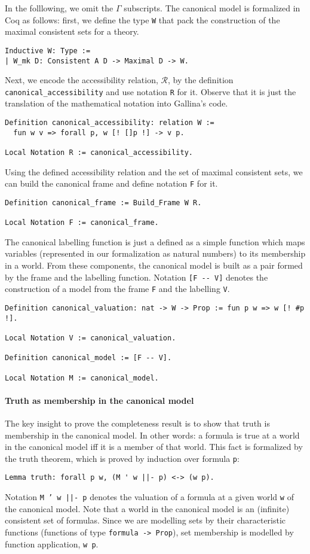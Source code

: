 \documentclass[3p,times]{elsarticle}
\begin{document}
In the folllowing, we omit the $\Gamma$ subscripts. The canonical model is formalized in Coq as follows: first, we define the type \texttt{W} that pack
the construction of the maximal consistent sets for a theory.
\begin{verbatim}
Inductive W: Type :=
| W_mk D: Consistent A D -> Maximal D -> W.
\end{verbatim}
Next, we encode the accessibility relation, $\mathcal{R}$, by
the definition \texttt{canonical_accessibility} and use
notation \texttt{R} for it. Observe that it is just the
translation of the mathematical notation into Gallina's code.
\begin{verbatim}
Definition canonical_accessibility: relation W :=
  fun w v => forall p, w [! []p !] -> v p.

Local Notation R := canonical_accessibility.
\end{verbatim}
Using the defined accessibility relation and the set of maximal consistent sets,
we can build the canonical frame and define notation \texttt{F} for it.
\begin{verbatim}
Definition canonical_frame := Build_Frame W R.

Local Notation F := canonical_frame.
\end{verbatim}
The canonical labelling function is just a defined as a simple function which maps variables (represented in
our formalization as natural numbers) to its membership in a world. From these components, the canonical model
is built as a pair formed by the frame and the labelling function. Notation \verb|[F -- V]| denotes the
construction of a model from the frame \verb|F| and the labelling \verb|V|.
\begin{verbatim}
Definition canonical_valuation: nat -> W -> Prop := fun p w => w [! #p !].

Local Notation V := canonical_valuation.

Definition canonical_model := [F -- V].

Local Notation M := canonical_model.
\end{verbatim}

\paragraph{Truth as membership in the canonical model}
The key insight to prove the completeness result is to show that truth is membership in the canonical model.
In other words: a formula is true at a world in the canonical model iff it is a member of that world.
This fact is formalized by the truth theorem, which is proved by induction over formula \verb|p|:
\begin{verbatim}
Lemma truth: forall p w, (M ' w ||- p) <-> (w p).
\end{verbatim}
Notation \texttt{M ' w ||- p} denotes the valuation of a formula at a given world \verb|w| of the
canonical model. Note that a world in the canonical model is an (infinite) consistent set of formulas.
Since we are modelling sets by their characteristic functions (functions of type \texttt{formula -> Prop}),
set membership is modelled by function application, \verb|w p|.
\end{document}
